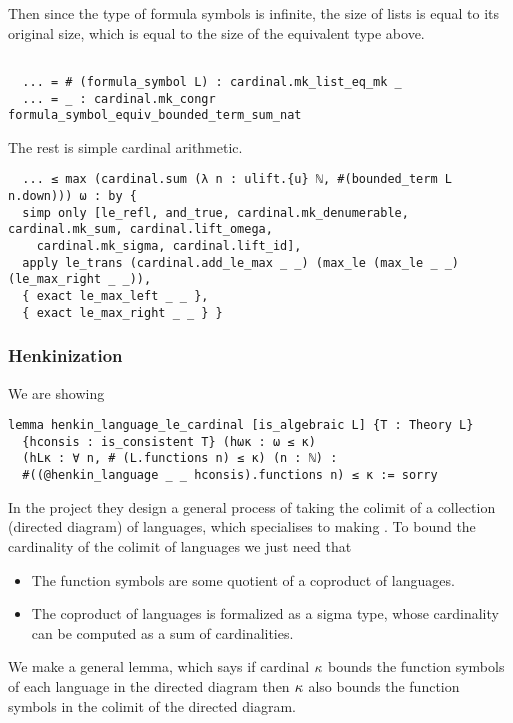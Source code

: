 Then since the type of formula symbols is infinite,
the size of lists is equal to its original size,
which is equal to the size of the equivalent type above.

\begin{lstlisting}

  ... = # (formula_symbol L) : cardinal.mk_list_eq_mk _
  ... = _ : cardinal.mk_congr formula_symbol_equiv_bounded_term_sum_nat \end{lstlisting}

The rest is simple cardinal arithmetic.

\begin{lstlisting}
  ... ≤ max (cardinal.sum (λ n : ulift.{u} ℕ, #(bounded_term L n.down))) ω : by {
  simp only [le_refl, and_true, cardinal.mk_denumerable, cardinal.mk_sum, cardinal.lift_omega,
    cardinal.mk_sigma, cardinal.lift_id],
  apply le_trans (cardinal.add_le_max _ _) (max_le (max_le _ _) (le_max_right _ _)),
  { exact le_max_left _ _ },
  { exact le_max_right _ _ } } \end{lstlisting}

\subsubsection{Henkinization}


We are showing

\begin{lstlisting}
lemma henkin_language_le_cardinal [is_algebraic L] {T : Theory L}
  {hconsis : is_consistent T} (hωκ : ω ≤ κ)
  (hLκ : ∀ n, # (L.functions n) ≤ κ) (n : ℕ) :
  #((@henkin_language _ _ hconsis).functions n) ≤ κ := sorry \end{lstlisting}

In the  project they design a general process of taking the colimit
of a collection (directed diagram) of languages,
which specialises to making .
To bound the cardinality of the colimit of languages we just need that
\begin{itemize}
  \item The function symbols are some quotient of a coproduct of languages.
  \item The coproduct of languages is formalized as a sigma type,
        whose cardinality can be computed as a sum of cardinalities.
\end{itemize}

We make a general lemma,
which says if cardinal $\kappa$ bounds the function symbols of each language
in the directed diagram then $\kappa$ also bounds
the function symbols in the colimit of the directed diagram.

